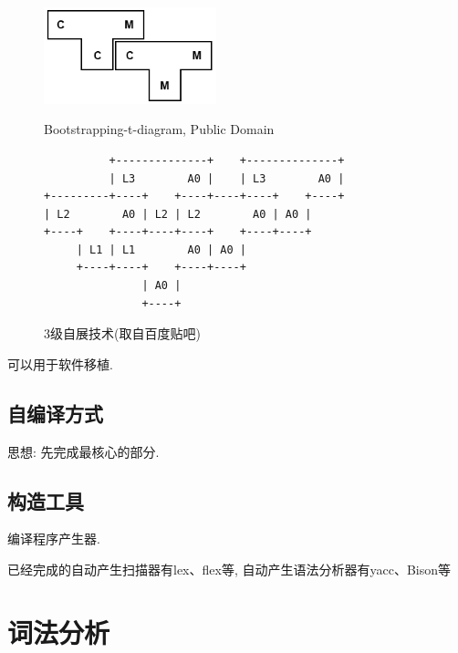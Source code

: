         \begin{figure}[h]\centering
            \begin{minipage}{0.5\linewidth} \centering
                \includegraphics[width=5cm]{compile_chaps/lect2_inc/Bootstrapping-t-diagram.png}
                \caption{Bootstrapping-t-diagram, Public Domain}
                \label{fig:2:bootstrapping}
            \end{minipage}
            \begin{minipage}{0.45\linewidth}
                {\small
\begin{verbatim}          +--------------+    +--------------+
          | L3        A0 |    | L3        A0 |
+---------+----+    +----+----+----+    +----+
| L2        A0 | L2 | L2        A0 | A0 |
+----+    +----+----+----+    +----+----+
     | L1 | L1        A0 | A0 |
     +----+----+    +----+----+
               | A0 |
               +----+\end{verbatim}}
                \caption{3级自展技术(取自百度贴吧)}
                \label{fig:2:3-self-extract}
            \end{minipage}
        \end{figure}


        可以用于软件移植.

    \subsection{自编译方式}

        思想: 先完成最核心的部分.

    \subsection{构造工具}

        编译程序产生器.

        已经完成的自动产生扫描器有lex、flex等, 自动产生语法分析器有yacc、Bison等

\iffalse
\section{词法分析}

